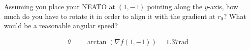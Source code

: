Assuming you place your NEATO at $(1, -1)$ pointing along the $y$-axis, how much do you have to rotate it in order to align it with the gradient at $r_0$? What would be a reasonable angular speed?

\begin{solution}
\begin{align*}
    \theta &= \arctan(\nabla f(1, -1)) = 1.37 \mathrm{rad}
\end{align*}
\end{solution}